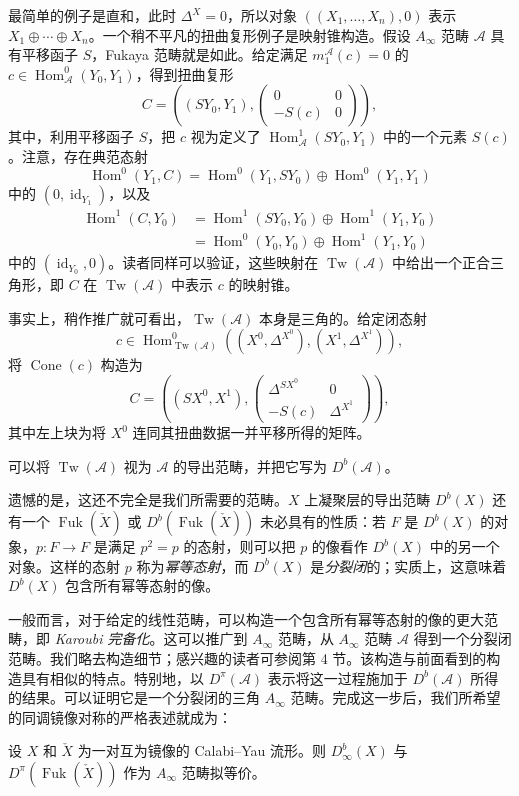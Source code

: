 最简单的例子是直和，此时 $\Delta^X=0$，所以对象 $((X_1,\ldots,X_n),0)$ 表示 $X_1\oplus\cdots\oplus X_n$。一个稍不平凡的扭曲复形例子是映射锥构造。假设 $A_\infty$ 范畴 $\mathcal A$ 具有平移函子 $S$，Fukaya 范畴就是如此。给定满足 $m_1^{\mathcal A}(c)=0$ 的 $c\in\operatorname{Hom}_{\mathcal A}^0(Y_0,Y_1)$，得到扭曲复形
\[
C=\left((SY_0,Y_1),\begin{pmatrix}0&0\\-S(c)&0\end{pmatrix}\right),
\]
其中，利用平移函子 $S$，把 $c$ 视为定义了 $\operatorname{Hom}_{\mathcal A}^1(SY_0,Y_1)$ 中的一个元素 $S(c)$。注意，存在典范态射
\[
\operatorname{Hom}^0(Y_1,C)=
\operatorname{Hom}^0(Y_1,SY_0)\oplus\operatorname{Hom}^0(Y_1,Y_1)
\]
中的 $(0,\operatorname{id}_{Y_1})$，以及
\[
\begin{aligned}
\operatorname{Hom}^1(C,Y_0)
&=\operatorname{Hom}^1(SY_0,Y_0)\oplus\operatorname{Hom}^1(Y_1,Y_0)\\
&=\operatorname{Hom}^0(Y_0,Y_0)\oplus\operatorname{Hom}^1(Y_1,Y_0)
\end{aligned}
\]
中的 $(\operatorname{id}_{Y_0},0)$。读者同样可以验证，这些映射在 $\operatorname{Tw}(\mathcal A)$ 中给出一个正合三角形，即 $C$ 在 $\operatorname{Tw}(\mathcal A)$ 中表示 $c$ 的映射锥。

事实上，稍作推广就可看出，$\operatorname{Tw}(\mathcal A)$ 本身是三角的。给定闭态射
\[
c\in\operatorname{Hom}_{\operatorname{Tw}(\mathcal A)}^0
((X^0,\Delta^{X^0}),(X^1,\Delta^{X^1})),
\]
将 $\operatorname{Cone}(c)$ 构造为
\[
C=\left((SX^0,X^1),
\begin{pmatrix}\Delta^{SX^0}&0\\-S(c)&\Delta^{X^1}\end{pmatrix}\right),
\]
其中左上块为将 $X^0$ 连同其扭曲数据一并平移所得的矩阵。

可以将 $\operatorname{Tw}(\mathcal A)$ 视为 $\mathcal A$ 的导出范畴，并把它写为 $D^b(\mathcal A)$。

遗憾的是，这还不完全是我们所需要的范畴。$X$ 上凝聚层的导出范畴 $D^b(X)$ 还有一个 $\operatorname{Fuk}(\check X)$ 或 $D^b(\operatorname{Fuk}(\check X))$ 未必具有的性质：若 $F$ 是 $D^b(X)$ 的对象，$p\colon F\to F$ 是满足 $p^2=p$ 的态射，则可以把 $p$ 的像看作 $D^b(X)$ 中的另一个对象。这样的态射 $p$ 称为\emph{幂等态射}，而 $D^b(X)$ 是\emph{分裂闭}的；实质上，这意味着 $D^b(X)$ 包含所有幂等态射的像。

一般而言，对于给定的线性范畴，可以构造一个包含所有幂等态射的像的更大范畴，即 \emph{Karoubi 完备化}。这可以推广到 $A_\infty$ 范畴，从 $A_\infty$ 范畴 $\mathcal A$ 得到一个分裂闭范畴。我们略去构造细节；感兴趣的读者可参阅第 4 节。该构造与前面看到的构造具有相似的特点。特别地，以 $D^\pi(\mathcal A)$ 表示将这一过程施加于 $D^b(\mathcal A)$ 所得的结果。可以证明它是一个分裂闭的三角 $A_\infty$ 范畴。完成这一步后，我们所希望的同调镜像对称的严格表述就成为：

\begin{conjecture}\label{conj:8.17}
设 $X$ 和 $\check X$ 为一对互为镜像的 Calabi--Yau 流形。则 $D^b_\infty(X)$ 与 $D^\pi(\operatorname{Fuk}(\check X))$ 作为 $A_\infty$ 范畴拟等价。
\end{conjecture}
